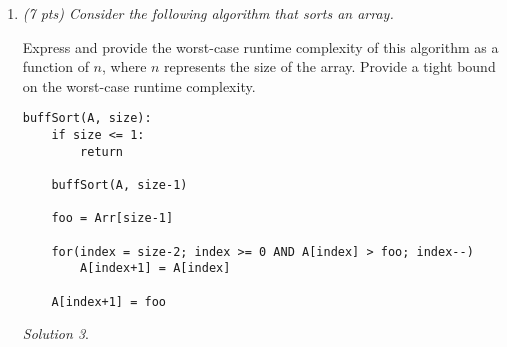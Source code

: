 \documentclass[12pt]{article}
\theoremstyle{remark}
\newtheorem*{solution}{Solution}
\newcommand{\makenonemptybox}[2]{%
\item[]
\fbox{%
\parbox[c][#1][t]{\dimexpr\linewidth-2\fboxsep-2\fboxrule}{
  \hrule width \hsize height 0pt
  #2
 }%
}%
\par\vspace{\ht\strutbox}
}
\begin{document}
\begin{enumerate}
\begin{enumerate}[label=(\alph*)]
\item (6 pts) Solve your recurrence \textbf{using the recurrence tree method} and get a tight bound on the worst-case runtime complexity. (It's ok to put an image of your hand drawn tree but label it neatly.)
\begin{solution}
\end{solution}
\pagebreak

\item (4 pts) Give a tight bound ($\Theta$ bound) on the number of {\tt return} calls this algorithm makes. Justify your answer.
\begin{solution}
\end{solution}
\pagebreak
\end{enumerate}




\pagebreak
\item {\itshape (7 pts) Consider the following algorithm that sorts an array.

\noindent Express and provide the worst-case runtime complexity of this algorithm as a function of $n$, where $n$ represents the size of the array. Provide a tight bound on the worst-case runtime complexity.
}
\begin{verbatim}
buffSort(A, size):
    if size <= 1:
        return
    
    buffSort(A, size-1)
    
    foo = Arr[size-1]
    
    for(index = size-2; index >= 0 AND A[index] > foo; index--)
        A[index+1] = A[index]
    
    A[index+1] = foo
\end{verbatim}
\begin{solution}
\end{solution}

\end{enumerate}
\end{document}
